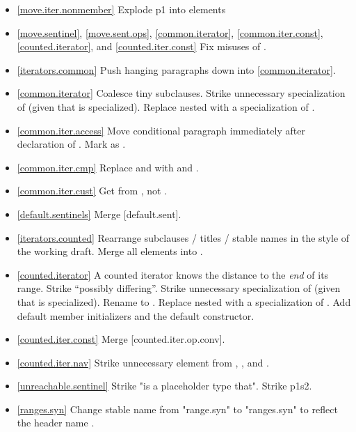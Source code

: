 \begin{itemize}
\item \ref{move.iter.nonmember} Explode p1 into \constraints elements
\item \ref{move.sentinel}, \ref{move.sent.ops}, \ref{common.iterator},
  \ref{common.iter.const}, \ref{counted.iterator},
  and \ref{counted.iter.const} Fix misuses of .
\item \ref{iterators.common} Push hanging paragraphs down
  into \ref{common.iterator}.
\item \ref{common.iterator} Coalesce tiny subclauses. Strike unnecessary
  specialization of  (given that 
  is specialized). Replace nested  with a specialization
  of .
\item \ref{common.iter.access} Move conditional  paragraph
  immediately after declaration of .
  Mark  as .
\item \ref{common.iter.cmp} Replace  and  with
   and .
\item \ref{common.iter.cust} Get  from , not .
\item \ref{default.sentinels} Merge [default.sent].
\item \ref{iterators.counted} Rearrange subclauses / titles / stable names
  in the style of the working draft. Merge all \returns elements into \effects.
\item \ref{counted.iterator} A counted iterator knows the distance to the
  \textit{end} of its range. Strike ``possibly differing''.
  Strike unnecessary specialization of 
  (given that  is specialized).
  Rename  to . Replace nested 
  with a specialization of .
  Add default member initializers and  the default constructor.
\item \ref{counted.iter.const} Merge [counted.iter.op.conv].
\item \ref{counted.iter.nav} Strike unnecessary \expects element from
  , , and
  .
\item \ref{unreachable.sentinel} Strike "is a placeholder type that".
  Strike p1s2.
\item \ref{ranges.syn} Change stable name from "range.syn" to "ranges.syn" to
  reflect the header name .

\end{itemize}
